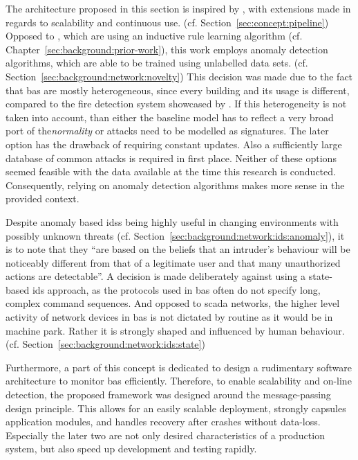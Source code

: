 The architecture proposed in this section is inspired by \textcite{Pan2014}, with extensions made in regards to scalability and continuous use. (cf. Section~\ref{sec:concept:pipeline})
Opposed to \textcite{Pan2014}, which are using an inductive rule learning algorithm (cf. Chapter~\ref{sec:background:prior-work}), this work employs anomaly detection algorithms, which are able to be trained using unlabelled data sets. (cf. Section~\ref{sec:background:network:novelty})
This decision was made due to the fact that \gls{bas} are mostly heterogeneous, since every building and its usage is different, compared to the fire detection system showcased by \textcite{Pan2014}.
If this heterogeneity is not taken into account, than either the baseline model has to reflect a very broad port of the\emph{normality} or attacks need to be modelled as signatures. The later option has the drawback of requiring constant updates. Also a sufficiently large database of common attacks is required in first place.
Neither of these options seemed feasible with the data available at the time this research is conducted.
Consequently, relying on anomaly detection algorithms makes more sense in the provided context.

Despite anomaly based \glspl{ids} being highly useful in changing environments with possibly unknown threats (cf. Section~\ref{sec:background:network:ids:anomaly}), it is to note that they \enquote{are based on the beliefs that an intruder's behaviour will be noticeably different from that of a legitimate user and that many unauthorized actions are detectable}. \parencite{Mukherjee1994,Yang2006}
A decision is made deliberately against using a state-based \gls{ids} approach, as the protocols used in \gls{bas} often do not specify long, complex command sequences. And opposed to \gls{scada} networks, the higher level activity of network devices in \gls{bas} is not dictated by routine as it would be in machine park. Rather it is strongly shaped and influenced by human behaviour. (cf. Section~\ref{sec:background:network:ids:state})

Furthermore, a part of this concept is dedicated to design a rudimentary software architecture to monitor \gls{bas} efficiently.
Therefore, to enable scalability and on-line detection, the proposed framework was designed around the message-passing design principle.
This allows for an easily scalable deployment, strongly capsules application modules, and handles recovery after crashes without data-loss.
Especially the later two are not only desired characteristics of a production system, but also speed up development and testing rapidly.

